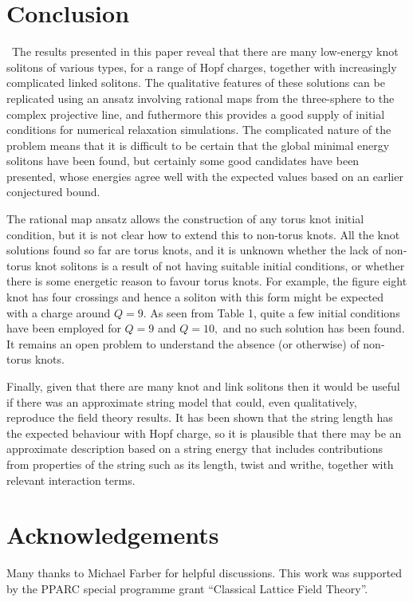 \documentclass[12pt]{article}
\newcommand{\news}{\setcounter{equation}{0}}
\begin{document}
\section{Conclusion}\news
\ \quad The results presented in this paper reveal that there are many
low-energy knot solitons of various types, for a range of Hopf charges, 
together with increasingly complicated linked solitons. The qualitative 
features of these solutions can be replicated using an ansatz involving
rational maps from the three-sphere to the complex projective line, and
futhermore this provides a good supply of initial conditions for
numerical relaxation simulations. The complicated nature of the problem   
means that it is difficult to be certain that the global minimal energy 
solitons have been found, but certainly some good candidates have been 
presented, whose energies agree well with the expected values based on an 
earlier conjectured bound.

The rational map ansatz allows the construction
of any torus knot initial condition, but it is not clear how to extend
this to non-torus knots. All the knot solutions found so far are torus
knots, and it is unknown whether the lack of non-torus knot solitons
is a result of not having suitable initial conditions, or whether there
is some energetic reason to favour torus knots. For example, the figure eight
knot has four crossings and hence a soliton with this form might be expected
with a charge around $Q=9.$ As seen from Table 1, quite a few initial 
conditions have been employed for $Q=9$ and $Q=10,$ and no such solution
has been found. It remains an open problem to understand the absence
(or otherwise) of non-torus knots.

Finally, given that there are many knot and link solitons then it would be
useful if there was an approximate string model that could, even 
qualitatively, reproduce the field theory results. It has been shown that
the string length has the expected behaviour with Hopf charge, so it is
plausible that there may be an approximate description based on a 
string energy that includes contributions from properties of the string such
as its length, twist and writhe, together with relevant interaction terms.   

 



 



\section*{Acknowledgements}
Many thanks to Michael Farber for helpful discussions.
This work was supported by the PPARC special programme
grant ``Classical Lattice Field Theory''. 
\end{document}
